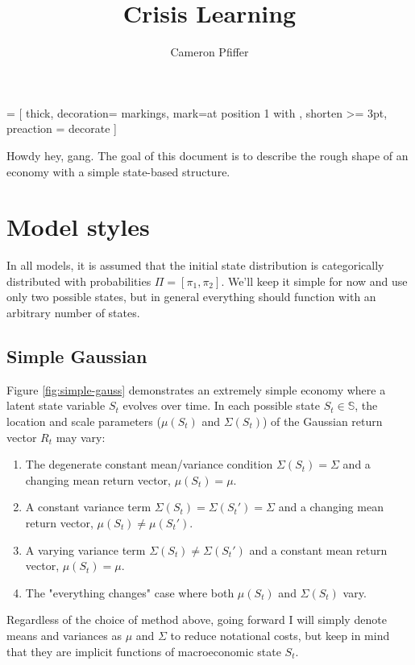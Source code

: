 \documentclass{article}
\title{Crisis Learning}
\author{Cameron Pfiffer}
\begin{document}
\newcommand{\Var}{\text{Var}}

 = [
	thick, 
	decoration={
		markings,
		mark=at position 1 with {
			}
		}, 
	shorten >= 3pt, preaction = {decorate}
	]

\maketitle

Howdy hey, gang. The goal of this document is to describe the rough shape of an economy with a simple state-based structure. 

\section{Model styles}

In all models, it is assumed that the initial state distribution is categorically distributed with probabilities $\Pi = [\pi_1, \pi_2]$. We'll keep it simple for now and use only two possible states, but in general everything should function with an arbitrary number of states. 

\subsection{Simple Gaussian}

Figure \ref{fig:simple-gauss} demonstrates an extremely simple economy where a latent state variable $S_t$ evolves over time. In each possible state $S_t \in \mathbb{S}$, the location and scale parameters ($\mu(S_t)$ and $\Sigma(S_t)$) of the Gaussian return vector $R_t$ may vary:

\begin{enumerate}
    \item The degenerate constant mean/variance condition
    $\Sigma(S_t)= \Sigma$ and a changing mean return vector, $\mu(S_t) = \mu$.
    \item A constant variance term $\Sigma(S_t) = \Sigma(S_t') = \Sigma$ and a changing mean return vector, $\mu(S_t) \ne \mu(S_t')$.
    \item A varying variance term $\Sigma(S_t) \ne \Sigma(S_t')$ and a constant mean return vector, $\mu(S_t) = \mu$.
    \item The "everything changes" case where both $\mu(S_t)$ and $\Sigma(S_t)$ vary.
\end{enumerate}

Regardless of the choice of method above, going forward I will simply denote means and variances as $\mu$ and $\Sigma$ to reduce notational costs, but keep in mind that they are implicit functions of macroeconomic state $S_t$.
\end{document}
